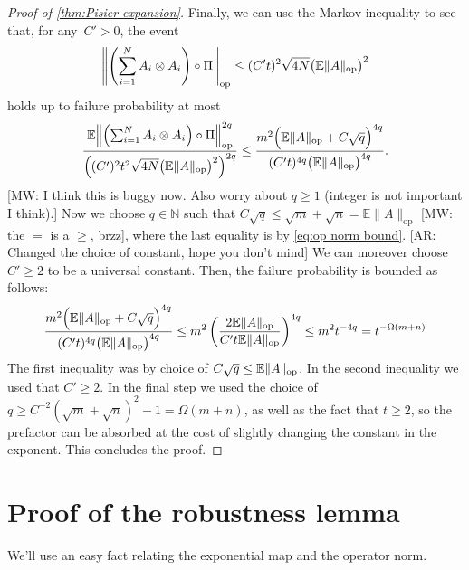 \documentclass[aos]{imsart}
\theoremstyle{definition}
\numberwithin{equation}{section}
\DeclareMathOperator{\op}{op}
\DeclarePairedDelimiter{\norm}{\lVert}{\rVert}
\newcommand{\E}{\mathbb{E}}
\newcommand{\AR}[1]{{\color{orange}[AR: #1]}}
\newcommand{\MW}[1]{{\color{red}[MW: #1]}}
\begin{document}
\begin{appendix}
\begin{proof} [Proof of \cref{thm:Pisier-expansion}]
Finally, we can use the Markov inequality to see that, for any~$C'>0$, the event
\begin{align*}
  \norm*{\left(\sum_{i=1}^N A_i \otimes A_i \right) \circ \Pi}_{\op} \leq (C' t)^2 \sqrt{4 N} \bigl( \E \norm{A}_{\op} \bigr)^2
\end{align*}
holds up to failure probability at most
\begin{align*}
  \frac{\E \norm*{\left(\sum_{i=1}^N A_i \otimes A_i \right) \circ \Pi}_{\op}^{2q}}{\left( (C')^2 t^2 \sqrt{4 N} \bigl( \E \norm{A}_{\op} \bigr)^2 \right)^{2q}}
\leq %
  \frac{m^2 \Bigl( \E\norm A_{\op} + C \sqrt{q} \Bigr)^{4q}}{(C' t)^{4q} \bigl( \E \norm{A}_{\op} \bigr)^{4q}}.
\end{align*}
\MW{I think this is buggy now. Also worry about $q\geq1$ (integer is not important I think).}
Now we choose $q \in \mathbb{N}$ such that $C \sqrt{q} \leq \sqrt m + \sqrt n = \E \|A\|_{\op}$ \MW{the $=$ is a $\geq$, brzz}, where the last equality is by \cref{eq:op norm bound}. \AR{Changed the choice of constant, hope you don't mind}
We can moreover choose~$C'\geq 2$ to be a universal constant.
Then, the failure probability is bounded as follows:
\begin{align*}
  \frac{m^2 \Bigl( \E\norm A_{\op} + C \sqrt{q} \Bigr)^{4q}}{(C' t)^{4q} \bigl( \E \norm{A}_{\op} \bigr)^{4q}}
\leq
m^2 \left( \frac{2 \E\norm A_{\op}}{C' t \E\norm A_{\op}} \right)^{4q}
\leq m^2 t^{-4q}
= t^{-\Omega(m+n)}
\end{align*}
The first inequality was by choice of $C \sqrt{q} \leq \E\norm A_{\op}$. In the second inequality we used that $C' \geq 2$. In the final step we used the choice of $q \geq C^{-2} (\sqrt{m} + \sqrt{n})^{2} - 1 = \Omega(m + n)$, as well as the fact that $t\geq2$, so the prefactor can be absorbed at the cost of slightly changing the constant in the exponent.
This concludes the proof.
\end{proof}


\section{Proof of the robustness lemma}\label{app:robust}
We'll use an easy fact relating the exponential map and the operator norm.


\end{appendix}
\end{document}
